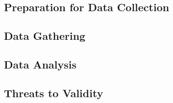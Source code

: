 \documentclass[10pt,twocolumn]{article}
\begin{document}
\subsection{Preparation for Data Collection}

\subsection{Data Gathering}

\subsection{Data Analysis}

\subsection{Threats to Validity}








\noindent
\end{document}

